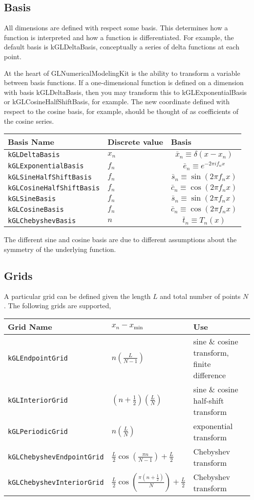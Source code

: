 \documentclass[11pt]{article}
\begin{document}
\subsection{Basis}

All dimensions are defined with respect some basis. This determines how a function is interpreted and how a function is differentiated. For example, the default basis is kGLDeltaBasis, conceptually a series of delta functions at each point.

At the heart of GLNumericalModelingKit is the ability to transform a variable between basis functions. If a one-dimensional function is defined on a dimension with basis kGLDeltaBasis, then you may transform this to kGLExponentialBasis or kGLCosineHalfShiftBasis, for example. The new coordinate defined with respect to the cosine basis, for example, should be thought of as coefficients of the cosine series. 

\begin{tabular}{llL}
      \hline
      Basis Name & Discrete value & Basis \tabularnewline \hline \hline
      \verb"kGLDeltaBasis" & $x_n$ &\[  \bar{x}_n \equiv  \delta( x - x_n) \] \tabularnewline
      \verb"kGLExponentialBasis" & $f_n$  & \[ \bar{e}_n \equiv e^{-2\pi i f_n x} \] \tabularnewline
      \verb"kGLSineHalfShiftBasis" & $f_n$ & \[ \bar{s}_n \equiv \sin( 2 \pi f_n x )\] \tabularnewline
      \verb"kGLCosineHalfShiftBasis" & $f_n$ & \[  \bar{c}_n \equiv \cos ( 2 \pi f_n x )\] \tabularnewline
       \verb"kGLSineBasis" & $f_n$ & \[ \bar{s}_n \equiv \sin ( 2 \pi f_n x )\] \tabularnewline
      \verb"kGLCosineBasis"&$f_n$ & \[ \bar{c}_n \equiv \cos ( 2 \pi f_n x ) \] \tabularnewline 
      \verb"kGLChebyshevBasis"& $n$ & \[ \bar{t}_n \equiv  T_n(x) \] \tabularnewline 
      \hline
\end{tabular}

The different sine and cosine basis are due to different assumptions about the symmetry of the underlying function.

\subsection{Grids}

A particular grid can be defined given the length $L$ and total number of points $N$. The following grids are supported,

\begin{tabular}{lllL}
      \hline
      Grid Name &$x_n-x_{\textrm{min}}$ & Use \tabularnewline \hline \hline
      \verb"kGLEndpointGrid" & $n \left(\frac{L}{N-1}\right)$ & sine \& cosine transform, finite difference \tabularnewline
      \verb"kGLInteriorGrid" & $\left(n + \frac{1}{2} \right) \left(\frac{L}{N}\right)$ & sine \& cosine half-shift transform \tabularnewline
      \verb"kGLPeriodicGrid" & $n \left(\frac{L}{N}\right)$ & exponential transform \tabularnewline
      \verb"kGLChebyshevEndpointGrid" & $ \frac{L}{2} \cos{ \left( \frac{\pi n}{N-1} \right) + \frac{L}{2}}$ & Chebyshev transform \tabularnewline
      \verb"kGLChebyshevInteriorGrid" & $\frac{L}{2} \cos{ \left( \frac{\pi (n+\frac{1}{2})}{N} \right) + \frac{L}{2} }$ & Chebyshev transform \tabularnewline
      \hline
\end{tabular}
\end{document}
